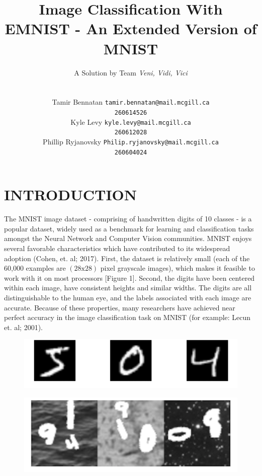 \documentclass[letterpaper, 10 pt, conference]{ieeeconf}  %
\title{\LARGE \bf
Image Classification With EMNIST - An Extended Version of MNIST
}
\author{ \large A Solution by Team \emph{Veni, Vidi, Vici}\\ \\
	\parbox{2 in}{\centering Tamir Bennatan
         {\tt\small tamir.bennatan@mail.mcgill.ca\\}
         {\tt\small 260614526}}
         \hspace*{ 0.3 in}
         \parbox{2 in}{\centering Kyle Levy
         {\tt\small kyle.levy@mail.mcgill.ca\\}
         {\tt\small 260612028}}
         \hspace*{0.3 in}
         \parbox{2 in}{\centering Phillip Ryjanovsky
         {\tt\small Philip.ryjanovsky@mail.mcgill.ca\\}
         {\tt\small 260604024}}
}
\begin{document}
\maketitle
\thispagestyle{empty}
\pagestyle{empty}




\section{INTRODUCTION}

The MNIST image dataset - comprising of handwritten digits of 10 classes - is a popular dataset, widely used as a  benchmark for learning and classification tasks amongst the Neural Network and Computer Vision communities. MNIST enjoys several favorable characteristics which have contributed to its widespread adoption (Cohen, et. al; 2017). First, the dataset is relatively small (each of the 60,000 examples are $(28\text{x}28)$ pixel grayscale images), which makes it feasible to work with it on most processors [Figure 1]. Second, the digits have been centered within each image, have consistent heights and similar widths. The digits are all distinguishable to the human eye, and the labels associated with each image are accurate. Because of these properties, many researchers have achieved near perfect accuracy in the image classification task on MNIST (for example: Lecun et. al; 2001).

\begin{figure}[ht]
\centering
\begin{minipage}{.5\textwidth}
  \centering
  \includegraphics[width=1\linewidth]{mnist_sample}
  \label{fig:test1}
\end{minipage}%
\begin{minipage}{.5\textwidth}
  \centering
  \includegraphics[width=1\linewidth]{emnist_sample}
  \label{fig:test2}
\end{minipage}
\end{figure}
\end{document}
